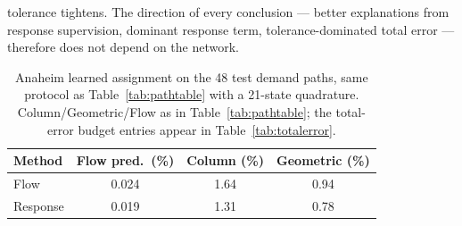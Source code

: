tolerance tightens. The direction of every
conclusion --- better explanations from response supervision, dominant
response term, tolerance-dominated total error --- therefore does not
depend on the network.
\begin{table}[t]\centering\footnotesize
\caption{Anaheim learned assignment on the 48 test demand paths, same
protocol as Table~\ref{tab:pathtable} with a 21-state quadrature.
Column/Geometric/Flow as in Table~\ref{tab:pathtable}; the
total-error budget entries appear in Table~\ref{tab:totalerror}.}
\label{tab:anaheimlearning}
\setlength{\tabcolsep}{5pt}
\begin{tabular*}{\tblwidth}{@{\extracolsep{\fill}}lccc}
\toprule
Method & Flow pred.\ (\%) & Column (\%) & Geometric (\%)\\
\midrule
Flow & 0.024 & 1.64 & 0.94\\
Response & 0.019 & 1.31 & 0.78\\
\bottomrule\end{tabular*}\end{table}
